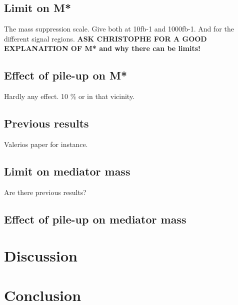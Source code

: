 \subsection{Limit on M*}
The mass suppression scale.
Give both at 10fb-1 and 1000fb-1. And for the different signal regions.
\textbf{ASK CHRISTOPHE FOR A GOOD EXPLANAITION OF M* and why there can be limits!}
\subsection{Effect of pile-up on M*}
Hardly any effect. 10 \% or in that vicinity.

\subsection{Previous results}
Valerios paper for instance.
\subsection{Limit on mediator mass}
Are there previous results?
\subsection{Effect of pile-up on mediator mass}
\section{Discussion}
\section{Conclusion}
